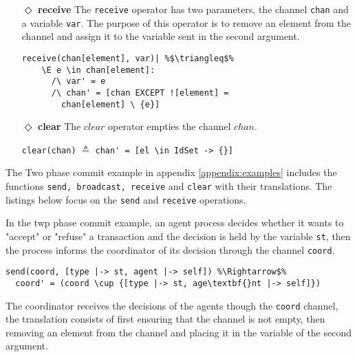 \begin{itemize}
\begin{minipage}{.8\textwidth}
\begin{lstlisting}[frame = none, numbers = none, escapechar=\%]
chan' = [a \in DOMAIN chan |-> 
					IF a \in sub
					THEN chan[a] \cup {msg}
					ELSE chan[a]]
\end{lstlisting}

\end{minipage}\hfill

\item[$\Diamond$]  \textbf{receive}
The \verb|receive| operator has two parameters, the channel \verb|chan| and a \tlaplus variable \verb|var|. The purpose of this operator is to remove an element from the channel and assign it to the variable sent in the second argument.

\begin{lstlisting}[frame = none, numbers = none, escapechar=\%]
receive(chan[element], var)| %$\triangleq$%
    \E e \in chan[element]:
      /\ var' = e
      /\ chan' = [chan EXCEPT ![element] =
        chan[element] \ {e}]
\end{lstlisting}

\item[$\Diamond$]  \textbf{clear}
The $clear$ operator empties the channel $chan$.

\lstinline|clear(chan)| $\triangleq$
\lstinline|chan' = [el \in IdSet -> {}]|

\end{itemize} 

The Two phase commit example in appendix \ref{appendix:examples} includes the functions \verb|send, broadcast, receive| and \verb|clear| with their \tlaplus translations. The listings below focus on the \verb|send| and \verb|receive| operations.\newline 

In the twp phase commit example, an agent process decides whether it wants to "accept" or "refuse" a transaction and the decision is held by the variable \verb|st|, then the process informs the coordinator of its decision through the channel \verb|coord|.

\begin{lstlisting}[frame = none, numbers = none, escapechar=\%]
send(coord, [type |-> st, agent |-> self]) %\Rightarrow$%
  coord' = (coord \cup {[type |-> st, age\textbf{}nt |-> self]})
\end{lstlisting}


The coordinator receives the decisions of the agents though the \verb|coord| channel, the translation consists of first ensuring that the channel is not empty, then removing an element from the channel and placing it in the variable of the second argument. 

